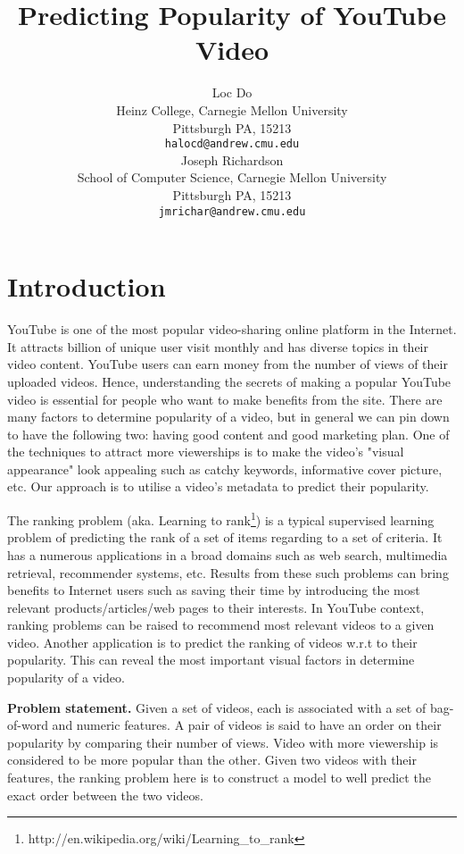 \documentclass{article} %
\title{Predicting Popularity of YouTube Video}
\author{
Loc Do \\
Heinz College,
Carnegie Mellon University \\
Pittsburgh PA, 15213\\
\texttt{halocd@andrew.cmu.edu} \\
\And
Joseph Richardson \\
School of Computer Science,
Carnegie Mellon University \\
Pittsburgh PA, 15213 \\
\texttt{jmrichar@andrew.cmu.edu} \\
}
\begin{document}
\maketitle

\section{Introduction}
\label{sec:intro}
YouTube is one of the most popular video-sharing online platform in the Internet. It attracts billion of unique user visit monthly and has diverse topics in their video content. YouTube users can earn money from the number of views of their uploaded videos. Hence, understanding the secrets of making a popular YouTube video is essential for people who want to make benefits from the site. There are many factors to determine popularity of a video, but in general we can pin down to have the following two: having good content and good marketing plan. One of the techniques to attract more viewerships is to make the video's "visual appearance" look appealing such as catchy keywords, informative cover picture, etc. Our approach is to utilise a video's metadata to predict their popularity.

The ranking problem (aka. Learning to rank\footnote{http://en.wikipedia.org/wiki/Learning\_to\_rank}) is a typical supervised learning problem of predicting the rank of a set of items regarding to a set of criteria. It has a numerous applications in a broad domains such as web search, multimedia retrieval, recommender systems, etc. Results from these such problems can bring benefits to Internet users such as saving their time by introducing the most relevant products/articles/web pages to their interests. In YouTube context, ranking problems can be raised to recommend most relevant videos to a given video. Another application is to predict the ranking of videos w.r.t to their popularity. This can reveal the most important visual factors in determine popularity of a video.

\textbf{Problem statement.} Given a set of videos, each is associated with a set of bag-of-word and numeric features. A pair of videos is said to have an order on their popularity by comparing their number of views. Video with more viewership is considered to be more popular than the other. Given two videos with their features, the ranking problem here is to construct a model to well predict the exact order between the two videos.




	

		 
\end{document}
